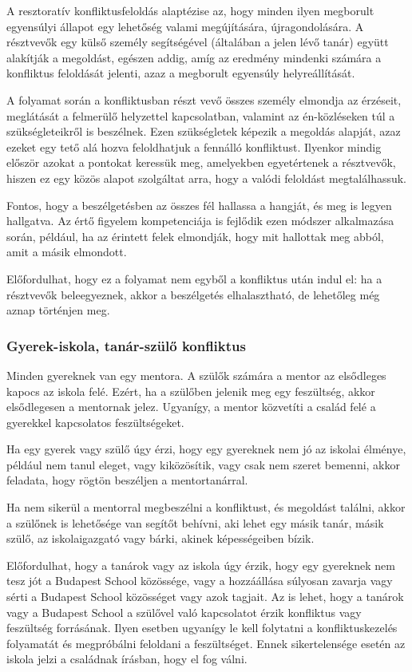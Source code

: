 A resztoratív konfliktusfeloldás alaptézise az, hogy minden ilyen megborult egyensúlyi állapot egy lehetőség valami megújítására, újragondolására. A résztvevők egy külső személy segítségével (általában a jelen lévő tanár) együtt alakítják a megoldást, egészen addig, amíg az eredmény mindenki számára a konfliktus feloldását jelenti, azaz a megborult egyensúly helyreállítását.

A folyamat során a konfliktusban részt vevő összes személy elmondja az érzéseit, meglátását a felmerülő helyzettel kapcsolatban, valamint az én-közléseken túl a szükségleteikről is beszélnek. Ezen szükségletek képezik a megoldás alapját, azaz ezeket egy tető alá hozva feloldhatjuk a fennálló konfliktust. Ilyenkor mindig először azokat a pontokat keressük meg, amelyekben egyetértenek a résztvevők, hiszen ez egy közös alapot szolgáltat arra, hogy a valódi feloldást megtalálhassuk.

Fontos, hogy a beszélgetésben az összes fél hallassa a hangját, és meg is legyen hallgatva. Az értő figyelem kompetenciája is fejlődik ezen módszer alkalmazása során, például, ha az érintett felek elmondják, hogy mit hallottak meg abból, amit a másik elmondott.

Előfordulhat, hogy ez a folyamat nem egyből a konfliktus után indul el: ha a résztvevők beleegyeznek, akkor a beszélgetés elhalasztható, de lehetőleg még aznap történjen meg.

\subsubsection{Gyerek-iskola, tanár-szülő konfliktus}

Minden gyereknek van egy mentora. A szülők számára a mentor az elsődleges kapocs az iskola felé. Ezért, ha a szülőben jelenik meg egy feszültség, akkor elsődlegesen a mentornak jelez. Ugyanígy, a mentor közvetíti a család felé a gyerekkel kapcsolatos feszültségeket.

Ha egy gyerek vagy szülő úgy érzi, hogy egy gyereknek nem jó az iskolai élménye, például nem tanul eleget, vagy kiközösítik, vagy csak nem szeret bemenni, akkor feladata, hogy rögtön beszéljen a mentortanárral.

Ha nem sikerül a mentorral megbeszélni a konfliktust, és megoldást találni, akkor a szülőnek is lehetősége van segítőt behívni, aki lehet egy másik tanár, másik szülő, az iskolaigazgató vagy bárki, akinek képességeiben bízik.

Előfordulhat, hogy a tanárok vagy az iskola úgy érzik, hogy egy gyereknek nem tesz jót a Budapest School közössége, vagy a hozzáállása súlyosan zavarja vagy sérti a Budapest School közösséget vagy azok tagjait. Az is lehet, hogy a tanárok vagy a Budapest School a szülővel való kapcsolatot érzik konfliktus vagy feszültség forrásának. Ilyen esetben ugyanígy le kell folytatni a konfliktuskezelés folyamatát és megpróbálni feloldani a feszültséget. Ennek sikertelensége esetén az iskola jelzi a családnak írásban, hogy el fog válni.

